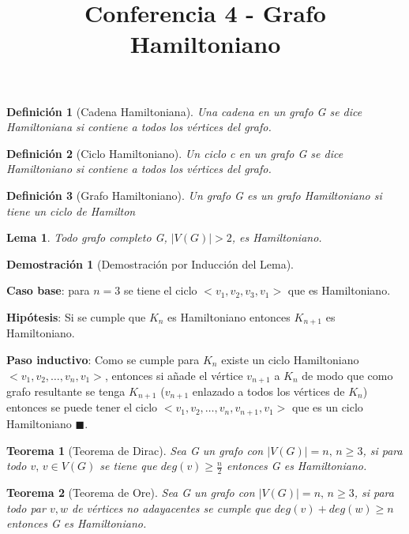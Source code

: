 \documentclass[a4paper,1pt]{report}
\title{Conferencia 4 - Grafo Hamiltoniano}
\author{}
\newtheorem*{teo}{Teorema}
\newtheorem*{dem}{Demostración}
\newtheorem*{dfn}{Definición}
\newtheorem*{lem}{Lema}
\begin{document}
\maketitle

\begin{dfn}[Cadena Hamiltoniana] 
Una cadena en un grafo G se dice Hamiltoniana si contiene a
todos los vértices del grafo.
\end{dfn}

\begin{dfn}[Ciclo Hamiltoniano]
Un ciclo c en un grafo G se dice Hamiltoniano si contiene a todos los vértices del grafo.
\end{dfn}

\begin{dfn}[Grafo Hamiltoniano]
Un grafo G es un grafo Hamiltoniano si tiene un ciclo de Hamilton
\end{dfn}

\begin{lem}
 Todo grafo completo G, $|V(G)|>2$, es Hamiltoniano. 
\end{lem}


\begin{dem}[Demostración por Inducción del Lema]
 
\end{dem}

\textbf{Caso base}: para $n=3$ se tiene el ciclo  $<v_1,v_2,v_3,v_1>$ que es Hamiltoniano.

\textbf{Hipótesis}: Si se cumple que $K_n$ es Hamiltoniano entonces $K_{n+1}$ es Hamiltoniano.

\textbf{Paso inductivo}: Como se cumple para $K_n$ existe un ciclo Hamiltoniano $<v_1,v_2,\dots,v_n,v_1>$, entonces si añade el vértice $v_{n+1}$ a $K_n$ de modo que como grafo resultante se tenga $K_{n+1}$ ($v_{n+1}$ enlazado a todos los vértices de $K_n$) entonces se puede tener el ciclo $<v_1,v_2,\dots,v_n,v_{n+1},v_1>$ que es un ciclo Hamiltoniano $\blacksquare$. 


\begin{teo}[Teorema de Dirac]
 Sea G un grafo con $|V(G)|=n,\, n\geq3$, si para todo $v,\, v\in V(G)$ se tiene que $deg(v)\geq \frac{n}{2}$ entonces G es Hamiltoniano.
\end{teo}

\begin{teo}[Teorema de Ore]
Sea G un grafo con $|V(G)|=n,\, n\geq3$, si para todo par $v,w$ de vértices no adayacentes se cumple que $deg(v)+deg(w)\geq n$ entonces G es Hamiltoniano.
\end{teo}
 
\end{document}
